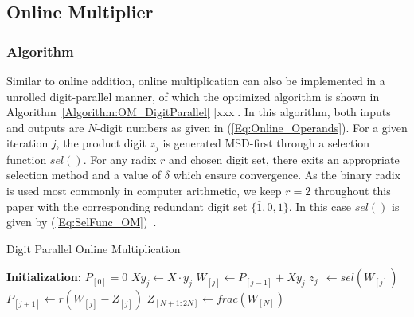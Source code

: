 \documentclass[10pt, conference, compsocconf]{IEEEtran}
\begin{document}
\subsection{Online Multiplier}
\subsubsection{Algorithm}
Similar to online addition, online multiplication can also be implemented in a unrolled digit-parallel manner, of which the optimized algorithm is shown in Algorithm~\ref{Algorithm:OM_DigitParallel} [xxx]. In this algorithm, both inputs and outputs are $N$-digit numbers as given in (\ref{Eq:Online_Operands}). For a given iteration $j$, the product digit $z_j$ is generated MSD-first through a selection function $sel()$. For any radix $r$ and chosen digit set, there exits an appropriate selection method and a value of $\delta$ which ensure convergence. As the binary radix is used most commonly in computer arithmetic, we keep $r=2$ throughout this paper with the corresponding redundant digit set $\{\overline{1},0,1\}$. In this case $sel()$ is given by (\ref{Eq:SelFunc_OM})~\cite{Ercegovac_OnlineMult}.

\begin{algorithm}[tbp]
  \caption{Digit Parallel Online Multiplication}\label{Algorithm:OM_DigitParallel}
  \begin{algorithmic}[1]
    \State \textbf{Initialization:} $P_{[0]}=0$                     \vspace{.5ex}
                                           \vspace{.5ex}
        \State $Xy_j \leftarrow X \cdot y_j$                        \vspace{.5ex}
        \State $W_{[j]}    \leftarrow  P_{[j-1]} + Xy_j$            \vspace{.5ex}
        \State $z_{j}  ~~      \leftarrow  sel(W_{[j]})$            \vspace{.5ex}
        \State $P_{[j+1]}  \leftarrow  r\left(W_{[j]}-Z_{[j]}\right)$   \vspace{.5ex}
    \EndFor                                                         \vspace{.5ex}
    \State $Z_{[N+1:2N]} \leftarrow frac(W_{[N]})$                  \vspace{.5ex}
  \end{algorithmic}
  \vspace{-1ex}
\end{algorithm}
\end{document}
